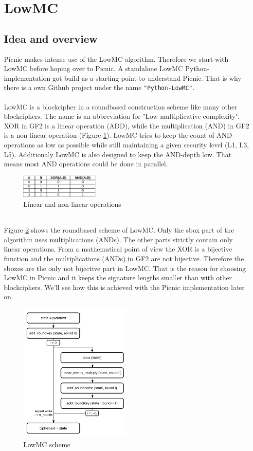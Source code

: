 \documentclass[]{article}
\begin{document}
\section{LowMC}
\subsection{Idea and overview}
Picnic makes intense use of the LowMC algorithm. Therefore we start with LowMC before hoping over to Picnic. A standalone LowMC Python-implementation got build as a starting point to understand Picnic. That is why there is a own Github project under the name \texttt{"Python-LowMC"}.\\ \\ 
LowMC is a blockcipher in a roundbased construction scheme like many other blockciphers. The name is an abbreviation for "Low multiplicative complexity". XOR in GF2 is a linear operation (ADD), while the multiplication (AND) in GF2 is a non-linear operation (Figure \ref{fig:gates}). LowMC tries to keep the count of AND operations as low as possible while still maintaining a given security level (L1, L3, L5). Additionaly LowMC is also designed to keep the AND-depth low. That means most AND operations could be done in parallel.\\
\begin{figure}[htbp]
\center
\includegraphics[width=0.35\textwidth]{pics/gates.pdf}
\caption{Linear and non-linear operations}
\label{fig:gates}
\end{figure}\\
Figure \ref{fig:lowmcscheme} shows the roundbased scheme of LowMC. Only the sbox part of the algorithm uses multiplications (ANDs). The other parts strictly contain only linear operations. From a mathematical point of view the XOR is a bijective function and the multiplications (ANDs) in GF2 are not bijective. Therefore the sboxes are the only not bijective part in LowMC. That is the reason for choosing LowMC in Picnic and it keeps the signature lengths smaller than with other blockciphers. We'll see how this is achieved with the Picnic implementation later on. 
\begin{figure}[htbp]
\center
\includegraphics[width=0.5\textwidth]{pics/lowmc_scheme.pdf}
\caption{LowMC scheme}
\label{fig:lowmcscheme}
\end{figure}
\end{document}
